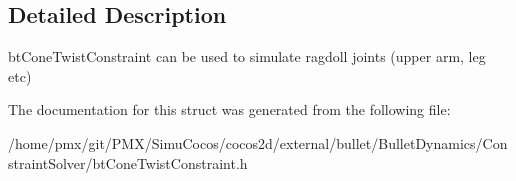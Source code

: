 \subsection{Detailed Description}
bt\+Cone\+Twist\+Constraint can be used to simulate ragdoll joints (upper arm, leg etc) 

The documentation for this struct was generated from the following file\+:\begin{DoxyCompactItemize}
\item 
/home/pmx/git/\+P\+M\+X/\+Simu\+Cocos/cocos2d/external/bullet/\+Bullet\+Dynamics/\+Constraint\+Solver/bt\+Cone\+Twist\+Constraint.\+h\end{DoxyCompactItemize}
